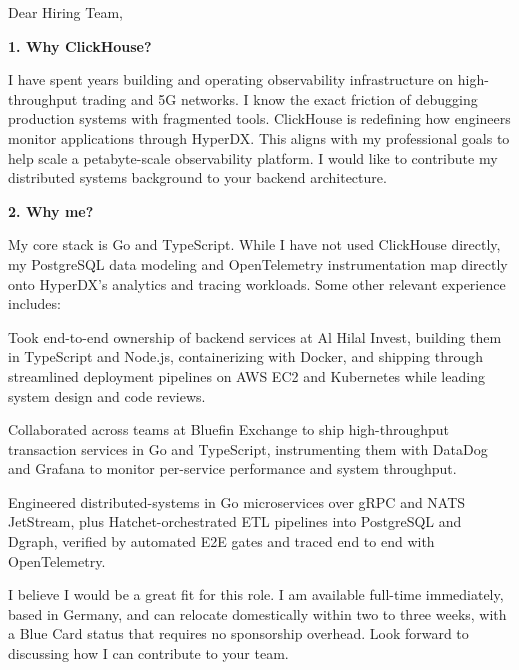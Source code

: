 \documentclass[11pt,a4paper]{coverletter}
\begin{document}

\opening{Dear Hiring Team,}

\vspace{8pt}\noindent\textbf{1. Why ClickHouse?}\par\vspace{3pt}

I have spent years building and operating observability infrastructure on high-throughput trading and 5G networks. I know the exact friction of debugging production systems with fragmented tools. ClickHouse is redefining how engineers monitor applications through HyperDX. This aligns with my professional goals to help scale a petabyte-scale observability platform. I would like to contribute my distributed systems background to your backend architecture.

\vspace{8pt}\noindent\textbf{2. Why me?}\par\vspace{3pt}

My core stack is Go and TypeScript. While I have not used ClickHouse directly, my PostgreSQL data modeling and OpenTelemetry instrumentation map directly onto HyperDX's analytics and tracing workloads. Some other relevant experience includes:

\bullets

  \item Took end-to-end ownership of backend services at Al Hilal Invest, building them in TypeScript and Node.js, containerizing with Docker, and shipping through streamlined deployment pipelines on AWS EC2 and Kubernetes while leading system design and code reviews.

  \item Collaborated across teams at Bluefin Exchange to ship high-throughput transaction services in Go and TypeScript, instrumenting them with DataDog and Grafana to monitor per-service performance and system throughput.

  \item Engineered distributed-systems in Go microservices over gRPC and NATS JetStream, plus Hatchet-orchestrated ETL pipelines into PostgreSQL and Dgraph, verified by automated E2E gates and traced end to end with OpenTelemetry.

\bulletsend

I believe I would be a great fit for this role. I am available full-time immediately, based in Germany, and can relocate domestically within two to three weeks, with a Blue Card status that requires no sponsorship overhead. Look forward to discussing how I can contribute to your team.
\end{document}
